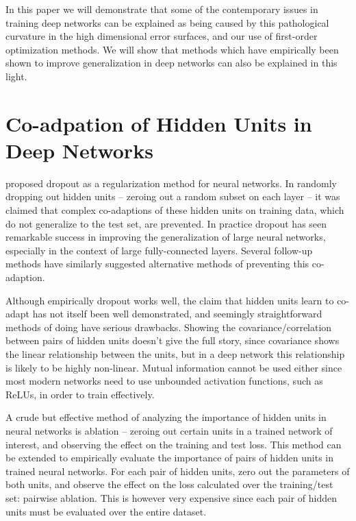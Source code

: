 \documentclass[thesis]{subfiles}
\begin{document}
In this paper we will demonstrate that some of the contemporary issues in training deep networks can be explained as being caused by this pathological curvature in the high dimensional error surfaces, and our use of first-order optimization methods. We will show that methods which have empirically been shown to improve generalization in deep networks can also be explained in this light.



\section{Co-adpation of Hidden Units in Deep Networks}
\citet{Hinton2012} proposed dropout as a regularization method for neural networks. In randomly dropping out hidden units -- zeroing out a random subset on each layer -- it was claimed that complex co-adaptions of these hidden units on training data, which do not generalize to the test set, are prevented. In practice dropout has seen remarkable success in improving the generalization of large neural networks, especially in the context of large fully-connected layers. Several follow-up methods have similarly suggested alternative methods of preventing this co-adaption.

Although empirically dropout works well, the claim that hidden units learn to co-adapt has not itself been well demonstrated, and seemingly straightforward methods of doing have serious drawbacks. Showing the covariance/correlation between pairs of hidden units doesn't give the full story, since covariance shows the linear relationship between the units, but in a deep network this relationship is likely to be highly non-linear. Mutual information cannot be used either since most modern networks need to use unbounded activation functions, such as ReLUs, in order to train effectively.

A crude but effective method of analyzing the importance of hidden units in neural networks is ablation -- zeroing out certain units in a trained network of interest, and observing the effect on the training and test loss. This method can be extended to empirically evaluate the importance of pairs of hidden units in trained neural networks. For each pair of hidden units, zero out the parameters of both units, and observe the effect on the loss calculated over the training/test set: pairwise ablation. This is however very expensive since each pair of hidden units must be evaluated over the entire dataset.
\end{document}
